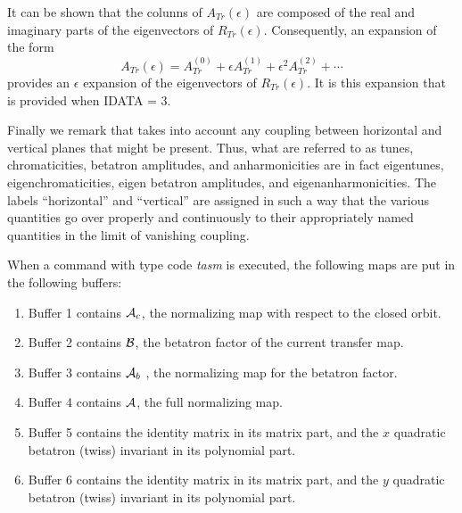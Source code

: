 It can be shown that the colunns of $A_{Tr}(\epsilon)$ are composed of the real and imaginary parts of the eigenvectors of $R_{Tr}(\epsilon)$.  Consequently, an expansion of the form
\begin{equation}
A_{Tr}(\epsilon) = A_{Tr}^{(0)} + \epsilon A_{Tr}^{(1)} +
\epsilon^2 A_{Tr}^{(2)} + \cdots
\end{equation}
provides an $\epsilon$ expansion of the eigenvectors of $R_{Tr}(\epsilon)$.  It is this expansion that is provided when IDATA = 3.

Finally we remark that \Mary takes into account any coupling between
horizontal and vertical planes that might be present.  Thus, what are
referred to as tunes, chromaticities, betatron amplitudes, and anharmonicities are in fact
eigentunes, eigenchromaticities, eigen betatron amplitudes, and eigenanharmonicities.  The labels
``horizontal'' and ``vertical'' are assigned in such a way that the various
quantities go over properly and continuously to their appropriately
named quantities in the limit of vanishing coupling.

     When a command with type code {\em tasm } is executed, the following maps
are put in the following buffers:
\begin{enumerate}
           \item  Buffer 1 contains ${\cal A}_c$, the normalizing map with respect to
                  the closed orbit.

           \item  Buffer 2 contains ${\cal B}$, the betatron factor of the current
                  transfer map.

           \item  Buffer 3 contains ${\cal A}_b$ , the normalizing map for the betatron
                  factor.

           \item  Buffer 4 contains ${\cal A}$, the full normalizing map.

           \item  Buffer 5 contains the identity matrix in its matrix part,
                  and the $x$ quadratic betatron (twiss) invariant in its polynomial part.

           \item  Buffer 6 contains the identity matrix in its matrix part,
                  and the $y$ quadratic betatron (twiss) invariant in its polynomial part.


\end{enumerate}


